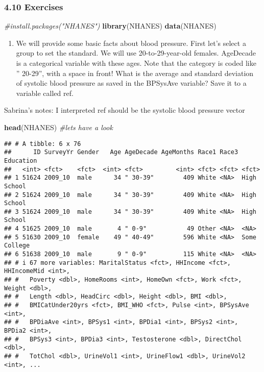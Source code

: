 \documentclass[
]{article}
\newenvironment{Shaded}{\begin{snugshade}}{\end{snugshade}}
\newcommand{\CommentTok}[1]{\textcolor[rgb]{0.56,0.35,0.01}{\textit{#1}}}
\newcommand{\FunctionTok}[1]{\textcolor[rgb]{0.13,0.29,0.53}{\textbf{#1}}}
\newcommand{\NormalTok}[1]{#1}
\providecommand{\tightlist}{%
  \setlength{\itemsep}{0pt}\setlength{\parskip}{0pt}}
\begin{document}
\hypertarget{exercises-3}{%
\subsubsection{4.10 Exercises}\label{exercises-3}}

\begin{Shaded}
\begin{Highlighting}[]
\CommentTok{\#install.packages("NHANES")}
\FunctionTok{library}\NormalTok{(NHANES)}
\FunctionTok{data}\NormalTok{(NHANES)}
\end{Highlighting}
\end{Shaded}

\begin{enumerate}
\def\labelenumi{\arabic{enumi}.}
\tightlist
\item
  We will provide some basic facts about blood pressure. First let's
  select a group to set the standard. We will use 20-to-29-year-old
  females. AgeDecade is a categorical variable with these ages. Note
  that the category is coded like '' 20-29'', with a space in front!
  What is the average and standard deviation of systolic blood pressure
  as saved in the BPSysAve variable? Save it to a variable called ref.
\end{enumerate}

Sabrina's notes: I interpreted ref should be the systolic blood pressure
vector

\begin{Shaded}
\begin{Highlighting}[]
\FunctionTok{head}\NormalTok{(NHANES) }\CommentTok{\#let\textquotesingle{}s have a look }
\end{Highlighting}
\end{Shaded}

\begin{verbatim}
## # A tibble: 6 x 76
##      ID SurveyYr Gender   Age AgeDecade AgeMonths Race1 Race3 Education   
##   <int> <fct>    <fct>  <int> <fct>         <int> <fct> <fct> <fct>       
## 1 51624 2009_10  male      34 " 30-39"        409 White <NA>  High School 
## 2 51624 2009_10  male      34 " 30-39"        409 White <NA>  High School 
## 3 51624 2009_10  male      34 " 30-39"        409 White <NA>  High School 
## 4 51625 2009_10  male       4 " 0-9"           49 Other <NA>  <NA>        
## 5 51630 2009_10  female    49 " 40-49"        596 White <NA>  Some College
## 6 51638 2009_10  male       9 " 0-9"          115 White <NA>  <NA>        
## # i 67 more variables: MaritalStatus <fct>, HHIncome <fct>, HHIncomeMid <int>,
## #   Poverty <dbl>, HomeRooms <int>, HomeOwn <fct>, Work <fct>, Weight <dbl>,
## #   Length <dbl>, HeadCirc <dbl>, Height <dbl>, BMI <dbl>,
## #   BMICatUnder20yrs <fct>, BMI_WHO <fct>, Pulse <int>, BPSysAve <int>,
## #   BPDiaAve <int>, BPSys1 <int>, BPDia1 <int>, BPSys2 <int>, BPDia2 <int>,
## #   BPSys3 <int>, BPDia3 <int>, Testosterone <dbl>, DirectChol <dbl>,
## #   TotChol <dbl>, UrineVol1 <int>, UrineFlow1 <dbl>, UrineVol2 <int>, ...
\end{verbatim}
\end{document}
